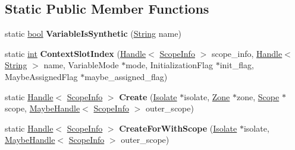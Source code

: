 \subsection*{Static Public Member Functions}
\begin{DoxyCompactItemize}
\item 
\mbox{\label{classv8_1_1internal_1_1ScopeInfo_af922665367d59e13423b5a37b775fb28}} 
static \mbox{\hyperlink{classbool}{bool}} {\bfseries Variable\+Is\+Synthetic} (\mbox{\hyperlink{classv8_1_1internal_1_1String}{String}} name)
\item 
\mbox{\label{classv8_1_1internal_1_1ScopeInfo_a0ca507b103cf2f4f4e1ac74610f721c9}} 
static \mbox{\hyperlink{classint}{int}} {\bfseries Context\+Slot\+Index} (\mbox{\hyperlink{classv8_1_1internal_1_1Handle}{Handle}}$<$ \mbox{\hyperlink{classv8_1_1internal_1_1ScopeInfo}{Scope\+Info}} $>$ scope\+\_\+info, \mbox{\hyperlink{classv8_1_1internal_1_1Handle}{Handle}}$<$ \mbox{\hyperlink{classv8_1_1internal_1_1String}{String}} $>$ name, Variable\+Mode $\ast$mode, Initialization\+Flag $\ast$init\+\_\+flag, Maybe\+Assigned\+Flag $\ast$maybe\+\_\+assigned\+\_\+flag)
\item 
\mbox{\label{classv8_1_1internal_1_1ScopeInfo_a1674c57a381520d1527b169dba5c0ea0}} 
static \mbox{\hyperlink{classv8_1_1internal_1_1Handle}{Handle}}$<$ \mbox{\hyperlink{classv8_1_1internal_1_1ScopeInfo}{Scope\+Info}} $>$ {\bfseries Create} (\mbox{\hyperlink{classv8_1_1internal_1_1Isolate}{Isolate}} $\ast$isolate, \mbox{\hyperlink{classv8_1_1internal_1_1Zone}{Zone}} $\ast$zone, \mbox{\hyperlink{classv8_1_1internal_1_1Scope}{Scope}} $\ast$scope, \mbox{\hyperlink{classv8_1_1internal_1_1MaybeHandle}{Maybe\+Handle}}$<$ \mbox{\hyperlink{classv8_1_1internal_1_1ScopeInfo}{Scope\+Info}} $>$ outer\+\_\+scope)
\item 
\mbox{\label{classv8_1_1internal_1_1ScopeInfo_adfd4392f945be6faac345a93b3db6485}} 
static \mbox{\hyperlink{classv8_1_1internal_1_1Handle}{Handle}}$<$ \mbox{\hyperlink{classv8_1_1internal_1_1ScopeInfo}{Scope\+Info}} $>$ {\bfseries Create\+For\+With\+Scope} (\mbox{\hyperlink{classv8_1_1internal_1_1Isolate}{Isolate}} $\ast$isolate, \mbox{\hyperlink{classv8_1_1internal_1_1MaybeHandle}{Maybe\+Handle}}$<$ \mbox{\hyperlink{classv8_1_1internal_1_1ScopeInfo}{Scope\+Info}} $>$ outer\+\_\+scope)

\end{DoxyCompactItemize}
